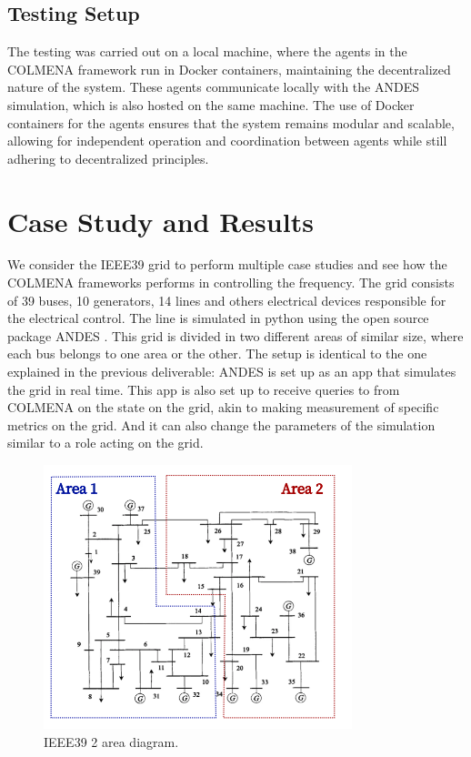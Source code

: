\documentclass{article}
\begin{document}
\subsection{Testing Setup}

The testing was carried out on a local machine, where the agents in the COLMENA framework run in Docker containers, maintaining the decentralized nature of the system. These agents communicate locally with the ANDES simulation, which is also hosted on the same machine. The use of Docker containers for the agents ensures that the system remains modular and scalable, allowing for independent operation and coordination between agents while still adhering to decentralized principles. 

\newpage
\section{Case Study and Results}

We consider the IEEE39 \cite{grids:ieee39} grid to perform multiple case studies and see how the COLMENA frameworks performs in controlling the frequency. The grid consists of 39 buses, 10 generators, 14 lines and others electrical devices responsible for the electrical control. The line is simulated in python using the open source package ANDES \cite{grids:models}. This grid is divided in two different areas of similar size, where each bus belongs to one area or the other. The setup is identical to the one explained in the previous deliverable: ANDES is set up as an app that simulates the grid in real time. This app is also set up to receive queries to from COLMENA on the state on the grid, akin to making measurement of specific metrics on the grid. And it can also change the parameters of the simulation similar to a role acting on the grid.

\begin{figure}[ht]
    \centering
    \includegraphics[width=0.8\textwidth]{figures/ieee2areas.png}
    \caption{IEEE39 2 area diagram.}
    \label{fig:ieee39_2areas}
\end{figure}
\end{document}
